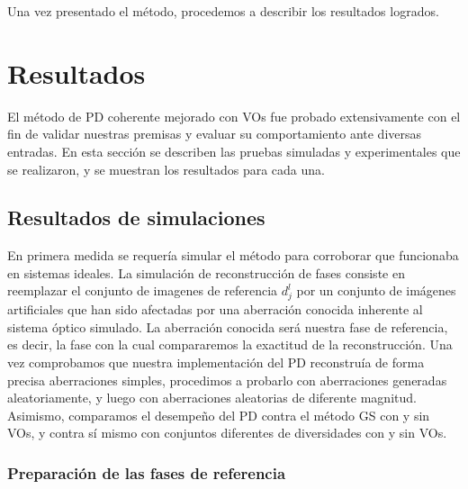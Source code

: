 Una vez presentado el método, procedemos a describir los resultados
logrados. 

\section{Resultados}
\label{sec:ChPD_resultados}
El método de PD coherente mejorado con VOs fue probado extensivamente
con el fin de validar nuestras premisas y evaluar su comportamiento ante diversas entradas. 
En esta sección se describen las pruebas simuladas y experimentales
que se realizaron, y se muestran los resultados para cada una. 

\subsection{Resultados de simulaciones}
\label{sec:ChPD_resultados_simulados}
En primera medida se requería simular el método para corroborar que
funcionaba en sistemas ideales. La simulación de reconstrucción de
fases consiste en reemplazar el conjunto de imagenes de referencia $d_j^l$ por un
conjunto de imágenes artificiales que han sido afectadas por una
aberración conocida inherente al sistema
óptico simulado. La aberración conocida será nuestra fase de
referencia, es decir, la fase con la cual compararemos la exactitud de
la reconstrucción. 
Una vez comprobamos que nuestra implementación del PD reconstruía de
forma precisa aberraciones simples, procedimos a probarlo con
aberraciones generadas aleatoriamente, y luego con aberraciones aleatorias de
diferente magnitud. Asimismo, comparamos el desempeño del PD contra el
método GS con y sin VOs, y contra sí mismo con conjuntos diferentes de
diversidades con y sin VOs.  

\subsubsection{Preparación de las fases de referencia}

